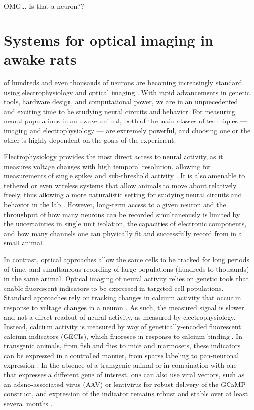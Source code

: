 \begin{savequote}[75mm]
OMG... Is that a neuron??
\end{savequote}

\chapter{Systems for optical imaging in awake rats}
 of hundreds and even thousands of neurons are becoming increasingly standard using electrophysiology \cite{NEUROPIXELS ETC} and optical imaging \cite{STRINGER}. With rapid advancements in genetic tools, hardware design, and computational power, we are in an unprecedented and exciting time to be studying neural circuits and behavior. For measuring neural populations in an awake animal, both of the main classes of techniques --- imaging and electrophysiology --- are extremely powerful, and choosing one or the other is highly dependent on the goals of the experiment. 

Electrophysiology provides the most direct access to neural activity, as it measures voltage changes with high temporal resolution, allowing for measurements of single spikes and sub-threshold activity \cite{REFREF}. It is also amenable to tethered or even wireless systems that allow animals to move about relatively freely, thus allowing a more naturalistic setting for studying neural circuits and behavior in the lab \cite{REFREF}. However, long-term access to a given neuron and the throughput of how many neurons can be recorded simultaneously is limited by the uncertainties in single unit isolation, the capacities of electronic components, and how many channels one can physically fit and successfully record from in a small animal. 

In contrast, optical approaches allow the same cells to be tracked for long periods of time, and simultaneous recording of large populations (hundreds to thousands) in the same animal. Optical imaging of neural activity relies on genetic tools that enable fluorescent indicators to be expressed in targeted cell populations. Standard approaches rely on tracking changes in calcium activity that occur in response to voltage changes in a neuron \cite{REFREF}. As such, the measured signal is slower and not a direct readout of neural activity, as measured by electrophysiology. Instead, calcium activity is measured by way of genetically-encoded fluorescent calcium indicators (GECIs)\cite{REFREF}, which fluoresce in response to calcium binding \cite{REFREF}. In transgenic animals, from fish\cite{REFREF} and flies\cite{REFREF} to mice\cite{REFREF} and marmosets\cite{REFREF}, these indicators can be expressed in a controlled manner, from sparse labeling \cite{REFREF} to pan-neuronal expression \cite{REFREF}. In the absence of a transgenic animal or in combination with one that expresses a different gene of interest, one can also use viral vectors, such as an adeno-associated virus (AAV) or lentivirus \cite{REFREF} for robust delivery of the GCaMP construct, and expression of the indicator remains robust and stable over at least several months \cite{REFREF}.

